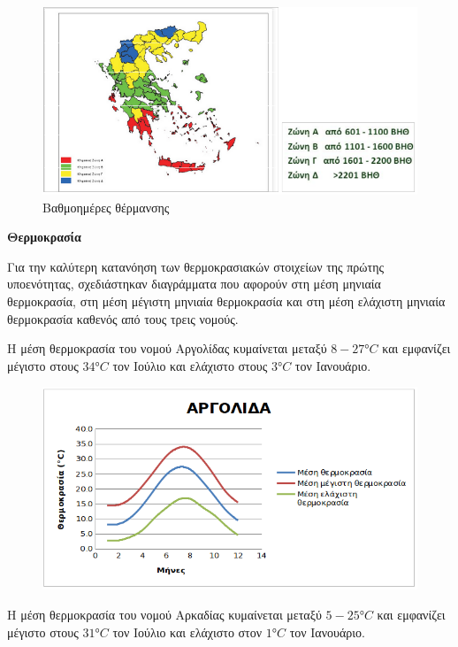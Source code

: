 \documentclass[12pt]{article}
\begin{document}
	\begin{figure} [H]
		\begin{center}
			\includegraphics [scale = 0.70] {thermansi.png}
			\caption{Βαθμοημέρες θέρμανσης}
			\label{bathmoimeres}
		\end{center}
	\end{figure}

	\textbf{Θερμοκρασία}
	
	Για την καλύτερη κατανόηση των θερμοκρασιακών στοιχείων της πρώτης υποενότητας, σχεδιάστηκαν διαγράμματα που αφορούν στη μέση μηνιαία θερμοκρασία, στη μέση μέγιστη μηνιαία θερμοκρασία και στη μέση ελάχιστη μηνιαία θερμοκρασία καθενός από τους τρεις νομούς.
	
	Η μέση θερμοκρασία του νομού Αργολίδας κυμαίνεται μεταξύ $8-27°C$ και εμφανίζει μέγιστο στους $34°C$ τον Ιούλιο και ελάχιστο στους $3°C$ τον Ιανουάριο.
	
	\begin{figure} [H]
		\begin{center}
			\includegraphics [scale = 0.80] {diagram.png}
		\end{center}
	\end{figure}

	Η μέση θερμοκρασία του νομού Αρκαδίας κυμαίνεται μεταξύ $5-25°C$ και εμφανίζει μέγιστο στους $31°C$ τον Ιούλιο και ελάχιστο στον $1°C$ τον Ιανουάριο.
	
\end{document}
